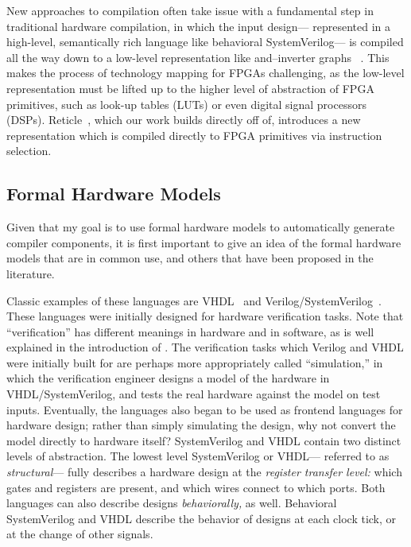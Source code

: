 New approaches to compilation
  often take issue
  with a fundamental step
  in traditional hardware compilation,
  in which the input design---%
  represented in a high-level,
  semantically rich language
  like behavioral SystemVerilog---%
  is compiled all the way down
  to a low-level representation
  like and--inverter graphs%
  ~\cite{callahan1998fast}.
This makes the process of
  technology mapping
  for FPGAs challenging,
  as the low-level representation
  must be lifted up
  to the 
  higher level of abstraction
  of FPGA primitives,
  such as look-up tables (LUTs)
  or even digital signal processors (DSPs).
Reticle~\cite{vega2021reticle},
  which our work builds directly off of,
  introduces a new representation
  which is compiled directly to
  FPGA primitives
  via instruction selection.
  
  


\subsection{Formal Hardware Models}
\label{sec:background-formal-hardware-models}

Given that my goal
  is to use formal hardware models
  to automatically generate
  compiler components,
  it is first important to
  give an idea of
  the formal hardware models
  that are
  in common use,
  and others that have been proposed
  in the literature.
  
Classic examples
  of these languages
  are VHDL~\cite{ieee20191076}
  and Verilog/SystemVerilog~\cite{design2005ieee}.
These languages
  were initially designed
  for hardware verification tasks.
Note that
  ``verification'' has different meanings
  in hardware and in software,
  as is well explained
  in the introduction of \cite{choi2017kami}.
The verification tasks
  which Verilog and VHDL
  were initially built for
  are perhaps more appropriately
  called ``simulation,''
  in which the verification engineer
  designs a model of the hardware
  in VHDL/SystemVerilog,
  and tests the real hardware
  against the model
  on test inputs.
Eventually,
  the languages also
  began to be used
  as frontend languages
  for hardware design;
  rather than simply simulating
  the design,
  why not convert the model
  directly to hardware itself?
SystemVerilog and VHDL
  contain two distinct
  levels of abstraction.
The lowest level
  SystemVerilog or VHDL---%
  referred to as
  \textit{structural}---%
  fully describes a hardware design
  at the 
  \textit{register transfer level:}
  which gates and registers
  are present,
  and which wires connect to
  which ports.
Both languages can also describe
  designs
  \textit{behaviorally,}
  as well.
Behavioral SystemVerilog and VHDL
  describe the behavior
  of designs
  at each clock tick,
  or at the change
  of other signals.
  
